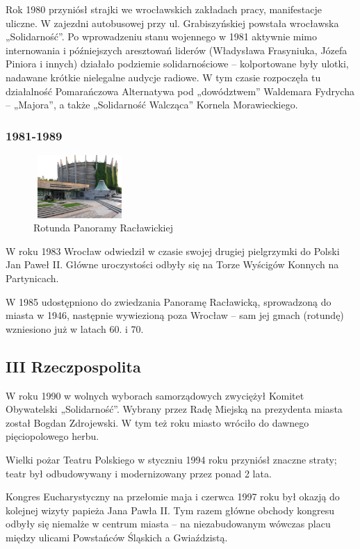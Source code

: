 \documentclass{article}
\begin{document}
Rok 1980 przyniósł strajki we wrocławskich zakładach pracy, manifestacje uliczne. W zajezdni autobusowej przy ul. Grabiszyńskiej powstała wrocławska „Solidarność”. Po wprowadzeniu stanu wojennego w 1981 aktywnie mimo internowania i późniejszych aresztowań liderów (Władysława Frasyniuka, Józefa Piniora i innych) działało podziemie solidarnościowe – kolportowane były ulotki, nadawane krótkie nielegalne audycje radiowe. W tym czasie rozpoczęła tu działalność Pomarańczowa Alternatywa pod „dowództwem” Waldemara Fydrycha – „Majora”, a także „Solidarność Walcząca” Kornela Morawieckiego.
\newpage

\subsubsection{1981-1989}

\begin{figure}
\includegraphics[width=3.5cm, height=2.4cm]{images/Zdjecie19.jpg}
\caption{Rotunda Panoramy Racławickiej}
\end{figure}

W roku 1983 Wrocław odwiedził w czasie swojej drugiej pielgrzymki do Polski Jan Paweł II. Główne uroczystości odbyły się na Torze Wyścigów Konnych na Partynicach.

W 1985 udostępniono do zwiedzania Panoramę Racławicką, sprowadzoną do miasta w 1946, następnie wywiezioną poza Wrocław – sam jej gmach (rotundę) wzniesiono już w latach 60. i 70.

\subsection{III Rzeczpospolita}

W roku 1990 w wolnych wyborach samorządowych zwyciężył Komitet Obywatelski „Solidarność”. Wybrany przez Radę Miejską na prezydenta miasta został Bogdan Zdrojewski. W tym też roku miasto wróciło do dawnego pięciopolowego herbu.

Wielki pożar Teatru Polskiego w styczniu 1994 roku przyniósł znaczne straty; teatr był odbudowywany i modernizowany przez ponad 2 lata.

Kongres Eucharystyczny na przełomie maja i czerwca 1997 roku był okazją do kolejnej wizyty papieża Jana Pawła II. Tym razem główne obchody kongresu odbyły się niemalże w centrum miasta – na niezabudowanym wówczas placu między ulicami Powstańców Śląskich a Gwiaździstą.
\end{document}
